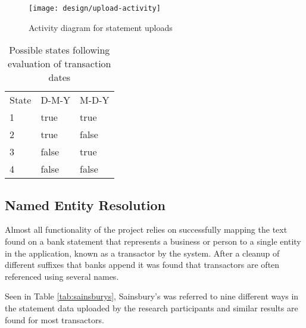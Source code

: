\begin{figure}[h]
    \centering
    \texttt{[image: design/upload-activity]}
    \caption{Activity diagram for statement uploads}
    \label{fig:fileupload}
    
    \begin{comment}
(start)->(Upload File)->(Identify File Format)-><a>[QIF]->(Identify Date Format)->(Parse Transactions),
<a>[OFX]->(Parse Transactions)->(Remove Duplicates)->(end),
<a>[Other]->(Reject Upload)
    \end{comment}
    
\end{figure}

\begin{table}[h]
\centering
\begin{tabular}{lll}
State & D-M-Y & M-D-Y \\
1     & true  & true  \\
2     & true  & false \\
3     & false & true  \\
4     & false & false
\end{tabular}
\caption{Possible states following evaluation of transaction dates}
\label{table:datestates}
\end{table}

% 

\subsection{Named Entity Resolution}
Almost all functionality of the project relies on successfully mapping the text found on a bank statement that represents a business or person to a single entity in the application, known as a \gls{transactor} by the system. After a cleanup of different suffixes that banks append it was found that \glspl{transactor} are often referenced using several names.

Seen in Table \ref{tab:sainsburys}, Sainsbury's was referred to nine different ways in the statement data uploaded by the research participants and similar results are found for most \glspl{transactor}.

